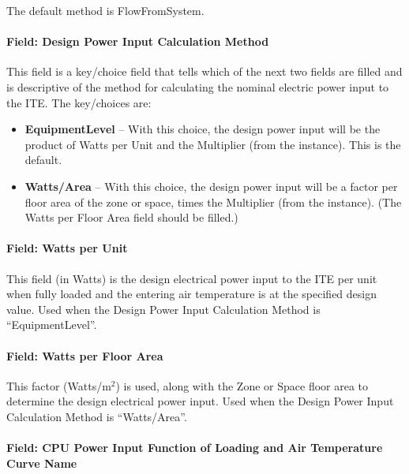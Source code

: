 The default method is FlowFromSystem.

\paragraph{Field: Design Power Input Calculation Method}\label{field-design-power-input-calculation-method-ite-definition}

This field is a key/choice field that tells which of the next two fields are filled and is descriptive of the method for calculating the nominal electric power input to the ITE. The key/choices are:

\begin{itemize}
\tightlist
\item
  \textbf{EquipmentLevel} -- With this choice, the design power input will be the product of Watts per Unit and the Multiplier (from the instance). This is the default.
\item
  \textbf{Watts/Area} -- With this choice, the design power input will be a factor per floor area of the zone or space, times the Multiplier (from the instance). (The Watts per Floor Area field should be filled.)
\end{itemize}

\paragraph{Field: Watts per Unit}\label{field-watts-per-unit-ite-definition}

This field (in Watts) is the design electrical power input to the ITE per unit when fully loaded and the entering air temperature is at the specified design value. Used when the Design Power Input Calculation Method is ``EquipmentLevel''.

\paragraph{Field: Watts per Floor Area}\label{field-watts-per-zone-floor-area-2-ite-definition}

This factor (Watts/m\(^{2}\)) is used, along with the Zone or Space floor area to determine the design electrical power input. Used when the Design Power Input Calculation Method is ``Watts/Area''.

\paragraph{Field: CPU Power Input Function of Loading and Air Temperature Curve Name}\label{field-cpu-power-input-function-of-loading-and-air-temperature-curve-name-ite-definition}

